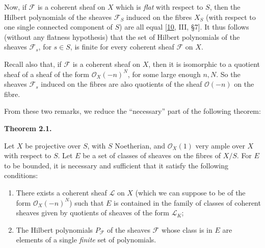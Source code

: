 \documentclass{article}
\providecommand{\tightlist}{%
  \setlength{\itemsep}{0pt}\setlength{\parskip}{0pt}}
\newenvironment{itenv}[1]
  {\phantomsection\par\smallskip\noindent\textbf{#1.}\itshape}
  {\par\smallskip}
\newcommand{\oldpage}[1]{\marginpar{\footnotesize$\Big\vert$ \textit{p.~#1}}}
\theoremstyle{definition}
\theoremstyle{definition}
\theoremstyle{definition}
\theoremstyle{definition}
\theoremstyle{remark}
\begin{document}
Now, if \({\mathscr{F}}\) is a coherent sheaf on \(X\) which is \emph{flat} with respect to \(S\), then the Hilbert polynomials of the sheaves \({\mathscr{F}}_S\) induced on the fibres \(X_S\) (with respect to one single connected component of \(S\)) are all equal {[}\protect\hyperlink{ref-GD1960}{10}, III, §7{]}.
It thus follows (without any flatness hypothesis) that the set of Hilbert polynomials of the sheaves \({\mathscr{F}}_s\), for \(s\in S\), is finite for every coherent sheaf \({\mathscr{F}}\) on \(X\).

\oldpage{221-06}Recall also that, if \({\mathscr{F}}\) is a coherent sheaf on \(X\), then it is isomorphic to a quotient sheaf of a sheaf of the form \({\mathscr{O}}_X(-n)^N\), for some large enough \(n,N\).
So the sheaves \({\mathscr{F}}_s\) induced on the fibres are also quotients of the sheaf \({\mathscr{O}}(-n)\) on the fibre.

From these two remarks, we reduce the ``necessary'' part of the following theorem:

\hypertarget{fga-3-iv-theorem-2.1}{}
\begin{itenv}{Theorem 2.1}

Let \(X\) be projective over \(S\), with \(S\) Noetherian, and \({\mathscr{O}}_X(1)\) very ample over \(X\) with respect to \(S\).
Let \(E\) be a set of classes of sheaves on the fibres of \(X/S\).
For \(E\) to be bounded, it is necessary and sufficient that it satisfy the following conditions:

\begin{enumerate}
\def\labelenumi{\alph{enumi}.}
\tightlist
\item
  There exists a coherent sheaf \({\mathscr{L}}\) on \(X\) (which we can suppose to be of the form \({\mathscr{O}}_X(-n)^N\)) such that \(E\) is contained in the family of classes of coherent sheaves given by quotients of sheaves of the form \({\mathscr{L}}_K\);
\item
  The Hilbert polynomials \(P_{\mathscr{F}}\) of the sheaves \({\mathscr{F}}\) whose class is in \(E\) are elements of a single \emph{finite} set of polynomials.
\end{enumerate}

\end{itenv}
\end{document}
